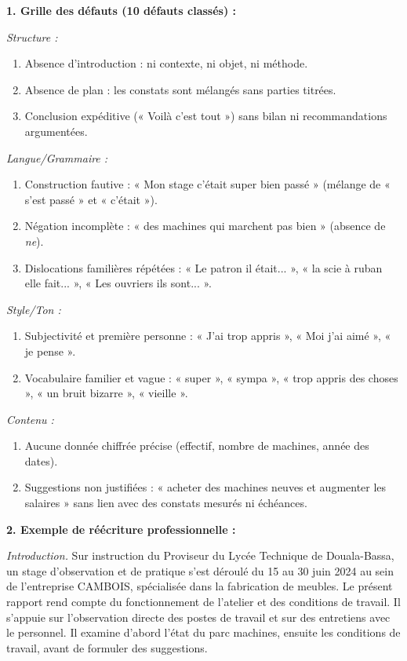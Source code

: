 \documentclass[11pt]{article}
\begin{document}
\begin{corrige}
\textbf{1. Grille des défauts (10 défauts classés) :}

\emph{Structure :}
\begin{enumerate}
    \item Absence d'introduction : ni contexte, ni objet, ni méthode.
    \item Absence de plan : les constats sont mélangés sans parties titrées.
    \item Conclusion expéditive (« Voilà c'est tout ») sans bilan ni recommandations argumentées.
\end{enumerate}
\emph{Langue/Grammaire :}
\begin{enumerate}
    \item[4.] Construction fautive : « Mon stage c'était super bien passé » (mélange de « s'est passé » et « c'était »).
    \item[5.] Négation incomplète : « des machines qui marchent pas bien » (absence de \emph{ne}).
    \item[6.] Dislocations familières répétées : « Le patron il était... », « la scie à ruban elle fait... », « Les ouvriers ils sont... ».
\end{enumerate}
\emph{Style/Ton :}
\begin{enumerate}
    \item[7.] Subjectivité et première personne : « J'ai trop appris », « Moi j'ai aimé », « je pense ».
    \item[8.] Vocabulaire familier et vague : « super », « sympa », « trop appris des choses », « un bruit bizarre », « vieille ».
\end{enumerate}
\emph{Contenu :}
\begin{enumerate}
    \item[9.] Aucune donnée chiffrée précise (effectif, nombre de machines, année des dates).
    \item[10.] Suggestions non justifiées : « acheter des machines neuves et augmenter les salaires » sans lien avec des constats mesurés ni échéances.
\end{enumerate}

\textbf{2. Exemple de réécriture professionnelle :}

\emph{Introduction.} Sur instruction du Proviseur du Lycée Technique de Douala-Bassa, un stage d'observation et de pratique s'est déroulé du 15 au 30 juin 2024 au sein de l'entreprise CAMBOIS, spécialisée dans la fabrication de meubles. Le présent rapport rend compte du fonctionnement de l'atelier et des conditions de travail. Il s'appuie sur l'observation directe des postes de travail et sur des entretiens avec le personnel. Il examine d'abord l'état du parc machines, ensuite les conditions de travail, avant de formuler des suggestions.


\end{corrige}
\end{document}
